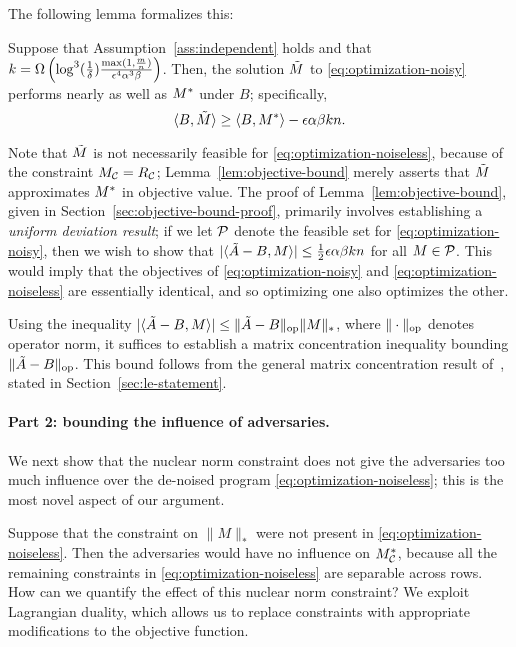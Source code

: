 The following lemma formalizes this:
\begin{lemma}
\label{lem:objective-bound}
Suppose that Assumption~\ref{ass:independent} holds and that 
$k = \Omega\left(  \log^3 ( \frac{1}{\delta}) \frac{\max(1,\frac{m}{n})}{\epsilon^4 \alpha^3 \beta} \right)$. 
Then, the solution $\tilde{M}$ to \eqref{eq:optimization-noisy} performs nearly as 
well as $M^*$ under $B$; specifically,
\begin{equation}
\label{eq:objective-bound}
\langle B, \tilde{M} \rangle \geq \langle B, M^* \rangle - \epsilon \alpha\beta kn.
\end{equation}
\end{lemma}
Note that $\tilde{M}$ is not necessarily feasible for \eqref{eq:optimization-noiseless}, 
because of the constraint $M_{\mathcal{C}} = R_{\mathcal{C}}$; Lemma~\ref{lem:objective-bound} 
merely asserts that $\tilde{M}$ approximates $M^*$ in objective value. The proof of 
Lemma~\ref{lem:objective-bound}, given in Section~\ref{sec:objective-bound-proof}, 
primarily involves establishing a 
\emph{uniform deviation result}; if we let $\mathcal{P}$ denote the feasible set for 
\eqref{eq:optimization-noisy}, then we wish to show that 
$|\langle \tilde{A} - B, M \rangle| \leq \frac{1}{2}\epsilon \alpha\beta kn$ for all 
$M \in \mathcal{P}$. This would imply that the objectives of 
\eqref{eq:optimization-noisy} and \eqref{eq:optimization-noiseless} are 
essentially identical, and so optimizing one also optimizes the other.

Using the inequality $|\langle \tilde{A} - B, M \rangle| \leq \|\tilde{A}-B\|_{\mathrm{op}}\|M\|_*$, 
where $\|\cdot\|_{\mathrm{op}}$ denotes operator norm, it suffices to establish a matrix 
concentration inequality bounding $\|\tilde{A} - B\|_{\mathrm{op}}$.   
This bound follows from the general matrix concentration result of~\cite{le2015concentration},
stated in Section~\ref{sec:le-statement}.

\paragraph{Part 2: bounding the influence of adversaries.} 
We next show that the nuclear norm constraint does 
not give the adversaries too much influence over the de-noised program 
\eqref{eq:optimization-noiseless}; this is the most novel aspect 
of our argument.

Suppose that the constraint on $\|M\|_*$ were not present in 
\eqref{eq:optimization-noiseless}. Then the adversaries would have 
no influence on $M^*_{\mathcal{C}}$, because all the remaining constraints 
in \eqref{eq:optimization-noiseless} are separable across rows. 
How can we quantify the effect of this nuclear norm constraint?
We exploit Lagrangian duality, which allows us to replace constraints 
with appropriate modifications to the objective function.

